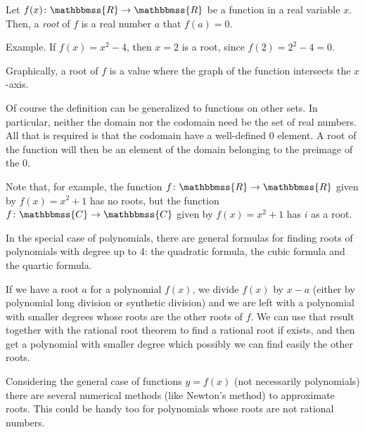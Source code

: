 \documentclass[12pt]{article}
\newcommand{\C}{\mathbbmss{C}}
\newcommand{\R}{\mathbbmss{R}}
\begin{document}
Let $f(x)\colon\R\rightarrow \R$ be a function in a real variable $x$. Then, a \emph{root} of $f$ is a real number $a$ that $f(a)=0$.

Example. If $f(x)=x^2-4$, then $x=2$ is a root, since $f(2)=2^2-4=0$. 

Graphically, a root of $f$ is a value where the graph of the function intersects the $x$-axis.

Of course the definition can be generalized to functions on other sets. In particular, neither the domain nor the codomain need be the set of real numbers.  All that is required is that the codomain have a well-defined $0$ element.   A root of the function will then be an element of the domain belonging to the preimage of the $0$.

Note that, for example, the function $f\colon\R\to\R$ given by $f(x)=x^2+1$ has no roots, but the function $f\colon\C\to\C$ given by $f(x)=x^2+1$ has $i$ as a root.

In the special case of polynomials, there are general formulas for finding roots of polynomials with degree up to 4: the quadratic formula, the cubic formula and the quartic formula.

If we have a root $a$ for a polynomial $f(x)$, we divide $f(x)$ by $x-a$ (either by polynomial long division or synthetic division) and we are left with a polynomial with smaller degrees whose roots are the other roots of $f$. We can use that result together with the rational root theorem to find a rational root if exists, and then get a polynomial with smaller degree which possibly we can find easily the other roots.

Considering the general case of functions $y=f(x)$ (not necessarily polynomials) there are several numerical methods (like Newton's method) to approximate roots. This could be handy too for polynomials whose roots are not rational numbers.
\end{document}
